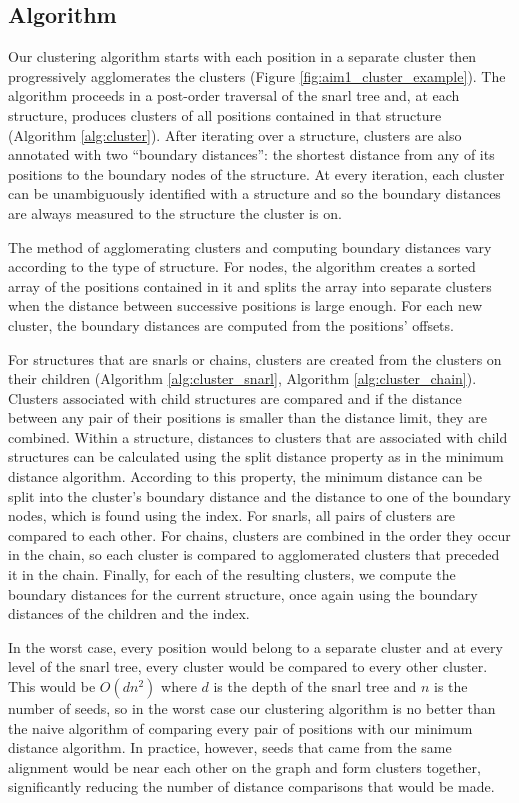 \documentclass[11pt]{ucscthesis}
\begin{document}
    
\subsection{Algorithm}


Our clustering algorithm starts with each position in a separate cluster then progressively agglomerates the clusters (Figure \ref{fig:aim1_cluster_example}).
The algorithm proceeds in a post-order traversal of the snarl tree and, at each structure, produces clusters of all positions contained in that structure (Algorithm \ref{alg:cluster}).
After iterating over a structure, clusters are also annotated with two ``boundary distances'': the shortest distance from any of its positions to the boundary nodes of the structure.
At every iteration, each cluster can be unambiguously identified with a structure and so the boundary distances are always measured to the structure the cluster is on.

The method of agglomerating clusters and computing boundary distances vary according to the type of structure.
For nodes, the algorithm creates a sorted array of the positions contained in it and splits the array into separate clusters when the distance between successive positions is large enough.
For each new cluster, the boundary distances are computed from the positions' offsets.


For structures that are snarls or chains, clusters are created from the clusters on their children (Algorithm \ref{alg:cluster_snarl}, Algorithm \ref{alg:cluster_chain}).
Clusters associated with child structures are compared and if the distance between any pair of their positions is smaller than the  distance limit, they are combined.
Within a structure, distances to clusters that are associated with child structures can be calculated using the split distance property as in the minimum distance algorithm.
According to this property, the minimum distance can be split into the cluster's boundary distance and the distance to one of the boundary nodes, which is found using the index.
For snarls, all pairs of clusters are compared to each other.
For chains, clusters are combined in the order they occur in the chain, so each cluster is compared to agglomerated clusters that preceded it in the chain.
Finally, for each of the resulting clusters, we compute the boundary distances for the current structure, once again using the boundary distances of the children and the index.

In the worst case, every position would belong to a separate cluster and at every level of the snarl tree, every cluster would be compared to every other cluster.
This would be $O(dn^2)$ where $d$ is the depth of the snarl tree and $n$ is the number of seeds, so in the worst case our clustering algorithm is no better than the naive algorithm of comparing every pair of positions with our minimum distance algorithm.
In practice, however, seeds that came from the same alignment would be near each other on the graph and form clusters together, significantly reducing the number of distance comparisons that would be made.
\end{document}
